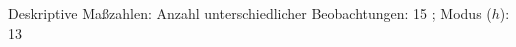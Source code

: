 				\label{tableValues:bact04b_g1}
				\vspace*{-\baselineskip}
                    \begin{noten}
                	    \note{} Deskriptive Maßzahlen:
                	    Anzahl unterschiedlicher Beobachtungen: 15%
                	    ; 
                	      Modus ($h$): 13
                     \end{noten}

